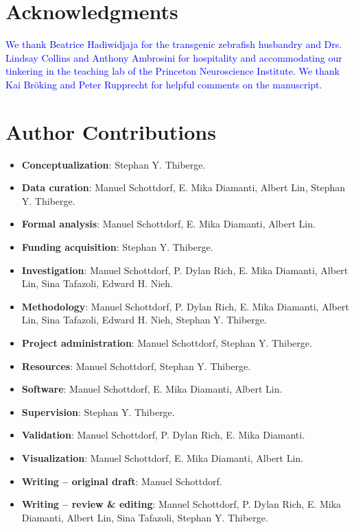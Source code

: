 \documentclass[10pt,letterpaper]{article}
\begin{document}
\section*{Acknowledgments}
\textcolor{blue}{We thank Beatrice Hadiwidjaja for the transgenic zebrafish husbandry and Drs. Lindsay Collins and Anthony Ambrosini for hospitality and accommodating our tinkering in the teaching lab of the Princeton Neuroscience Institute. We thank Kai Br\"oking and Peter Rupprecht for helpful comments on the manuscript.}

\section*{Author Contributions}
\begin{itemize}
    \item \textbf{Conceptualization}: Stephan Y. Thiberge.
    \item \textbf{Data curation}: Manuel Schottdorf, E. Mika Diamanti, Albert Lin, Stephan Y. Thiberge.
    \item \textbf{Formal analysis}: Manuel Schottdorf, E. Mika Diamanti, Albert Lin.
    \item \textbf{Funding acquisition}: Stephan Y. Thiberge.
    \item \textbf{Investigation}: Manuel Schottdorf, P. Dylan Rich, E. Mika Diamanti, Albert Lin, Sina Tafazoli, Edward H. Nieh.
    \item \textbf{Methodology}: Manuel Schottdorf, P. Dylan Rich, E. Mika Diamanti, Albert Lin, Sina Tafazoli, Edward H. Nieh, Stephan Y. Thiberge. 
    \item \textbf{Project administration}: Manuel Schottdorf, Stephan Y. Thiberge.
    \item \textbf{Resources}: Manuel Schottdorf, Stephan Y. Thiberge.
    \item \textbf{Software}: Manuel Schottdorf, E. Mika Diamanti, Albert Lin.
    \item \textbf{Supervision}: Stephan Y. Thiberge.
    \item \textbf{Validation}: Manuel Schottdorf, P. Dylan Rich, E. Mika Diamanti.
    \item \textbf{Visualization}: Manuel Schottdorf, E. Mika Diamanti, Albert Lin.
    \item \textbf{Writing – original draft}: Manuel Schottdorf.
    \item \textbf{Writing – review \& editing}: Manuel Schottdorf, P. Dylan Rich, E. Mika Diamanti, Albert Lin, Sina Tafazoli, Stephan Y. Thiberge.
\end{itemize}
\end{document}
